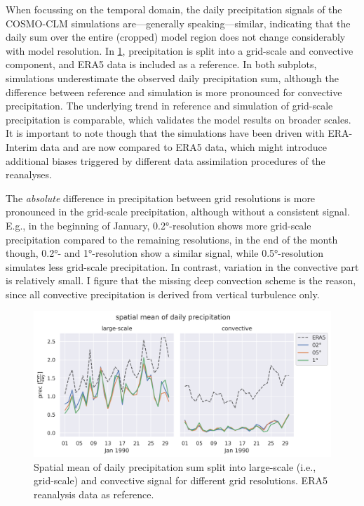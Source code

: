 When focussing on the temporal domain, the daily precipitation signals of the COSMO-CLM simulations are---generally speaking---similar, indicating that the daily sum over the entire (cropped) model region does not change considerably with model resolution. In \cref{fig:fldmean}, precipitation is split into a grid-scale and convective component, and ERA5 data is included as a reference.
In both subplots, simulations underestimate the observed daily precipitation sum, although the difference between reference and simulation is more pronounced for convective precipitation. The underlying trend in reference and simulation of grid-scale precipitation is comparable, which validates the model results on broader scales. It is important to note though that the simulations have been driven with ERA-Interim data and are now compared to ERA5 data, which might introduce additional biases triggered by different data assimilation procedures of the reanalyses.

The \textit{absolute} difference in precipitation between grid resolutions is more pronounced in the grid-scale precipitation, although without a consistent signal. E.g., in the beginning of January, 0.2°-resolution shows more grid-scale precipitation compared to the remaining resolutions, in the end of the month though, 0.2°- and 1°-resolution show a similar signal, while 0.5°-resolution simulates less grid-scale precipitation. In contrast, variation in the convective part is relatively small. I figure that the missing deep convection scheme is the reason, since all convective precipitation is derived from vertical turbulence only.

\begin{figure}
	\centering
	\includegraphics[width=\figwidth]{../figs/5-gsp-con.png}
	\caption{Spatial mean of daily precipitation sum split into large-scale (i.e., grid-scale) and convective signal for different grid resolutions. ERA5 reanalysis data as reference.}
	\label{fig:fldmean}
\end{figure}